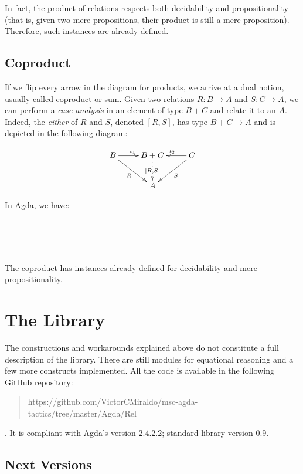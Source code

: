 In fact, the product of relations respects both decidability and propositionality (that is,
given two mere propositions, their product is still a mere proposition). Therefore, such 
instances are already defined.

\subsection{Coproduct}

If we flip every arrow in the diagram for products, we arrive at a dual notion, usually
called coproduct or sum. Given two relations $R : B \rightarrow A$ and $S : C \rightarrow A$,
we can perform a \emph{case analysis} in an element of type $B + C$ and relate it to an $A$.
Indeed, the \emph{either} of $R$ and $S$, denoted $[R , S]$, has type $B + C \rightarrow A$
and is depicted in the following diagram:

\begin{displaymath}
\xymatrix{%
 B \ar[r]^{\iota_1} \ar[dr]_{R} & B + C \ar@{..>}[d]|{[R , S]} & C \ar[l]_{\iota_2} \ar[dl]^{S} \\
   &   A   &
}
\end{displaymath}

In Agda, we have:

\\
\\
\\

The coproduct has instances already defined for decidability and mere propositionality.

\section{The Library}

The constructions and workarounds explained above do not constitute a full description of the library.
There are still modules for equational reasoning and a few more constructs implemented.
All the code is available in the following GitHub repository: 
\begin{quote}
\small https://github.com/VictorCMiraldo/msc-agda-tactics/tree/master/Agda/Rel
\end{quote}. It is compliant with Agda's version 2.4.2.2; standard library version 0.9.

\subsection{Next Versions}

